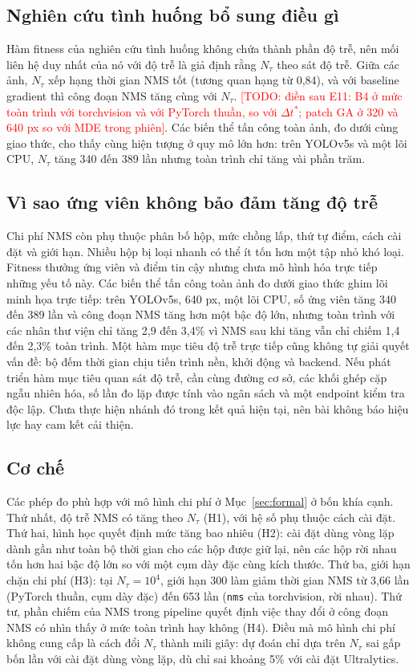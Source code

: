 \documentclass[a4paper,fleqn]{cas-dc}
\newcommand{\todo}[1]{\textcolor{red}{[TODO: #1]}}
\newcommand{\Ntau}{N_{\tau}}
\begin{document}
\subsection{Nghiên cứu tình huống bổ sung điều gì}
Hàm fitness của nghiên cứu tình huống không chứa thành phần độ trễ, nên mối liên hệ duy nhất của nó với độ trễ là giả định rằng $\Ntau$ theo sát độ trễ. Giữa các ảnh, $\Ntau$ xếp hạng thời gian NMS tốt (tương quan hạng từ 0,84), và với baseline gradient thì công đoạn NMS tăng cùng với $\Ntau$. \todo{điền sau E11: B4 ở mức toàn trình với torchvision và với PyTorch thuần, so với $\Delta t^{*}$; patch GA ở 320 và 640 px so với MDE trong phiên}. Các biến thể tấn công toàn ảnh, đo dưới cùng giao thức, cho thấy cùng hiện tượng ở quy mô lớn hơn: trên YOLOv5s và một lõi CPU, $\Ntau$ tăng 340 đến 389 lần nhưng toàn trình chỉ tăng vài phần trăm.

\subsection{Vì sao ứng viên không bảo đảm tăng độ trễ}
Chi phí NMS còn phụ thuộc phân bố hộp, mức chồng lấp, thứ tự điểm, cách cài đặt và giới hạn. Nhiều hộp bị loại nhanh có thể ít tốn hơn một tập nhỏ khó loại. Fitness thưởng ứng viên và điểm tin cậy nhưng chưa mô hình hóa trực tiếp những yếu tố này. Các biến thể tấn công toàn ảnh đo dưới giao thức ghim lõi minh họa trực tiếp: trên YOLOv5s, 640 px, một lõi CPU, số ứng viên tăng 340 đến 389 lần và công đoạn NMS tăng hơn một bậc độ lớn, nhưng toàn trình với các nhân thư viện chỉ tăng 2,9 đến 3,4\% vì NMS sau khi tăng vẫn chỉ chiếm 1,4 đến 2,3\% toàn trình. Một hàm mục tiêu độ trễ trực tiếp cũng không tự giải quyết vấn đề: bộ đếm thời gian chịu tiến trình nền, khởi động và backend. Nếu phát triển hàm mục tiêu quan sát độ trễ, cần cùng đường cơ sở, các khối ghép cặp ngẫu nhiên hóa, số lần đo lặp được tính vào ngân sách và một endpoint kiểm tra độc lập. Chưa thực hiện nhánh đó trong kết quả hiện tại, nên bài không báo hiệu lực hay cam kết cải thiện.

\subsection{Cơ chế}
Các phép đo phù hợp với mô hình chi phí ở Mục~\ref{sec:formal} ở bốn khía cạnh. Thứ nhất, độ trễ NMS có tăng theo $\Ntau$ (H1), với hệ số phụ thuộc cách cài đặt. Thứ hai, hình học quyết định mức tăng bao nhiêu (H2): cài đặt dùng vòng lặp dành gần như toàn bộ thời gian cho các hộp được giữ lại, nên các hộp rời nhau tốn hơn hai bậc độ lớn so với một cụm dày đặc cùng kích thước. Thứ ba, giới hạn chặn chi phí (H3): tại $\Ntau=10^4$, giới hạn 300 làm giảm thời gian NMS từ 3,66 lần (PyTorch thuần, cụm dày đặc) đến 653 lần (\texttt{nms} của torchvision, rời nhau). Thứ tư, phần chiếm của NMS trong pipeline quyết định việc thay đổi ở công đoạn NMS có nhìn thấy ở mức toàn trình hay không (H4). Điều mà mô hình chi phí không cung cấp là cách đổi $\Ntau$ thành mili giây: dự đoán chỉ dựa trên $\Ntau$ sai gấp bốn lần với cài đặt dùng vòng lặp, dù chỉ sai khoảng 5\% với cài đặt Ultralytics.
\end{document}
